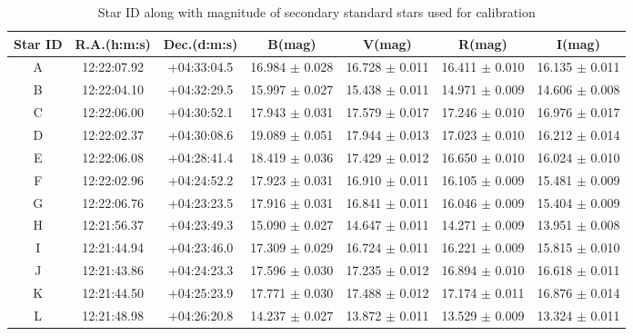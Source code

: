 \begin{table*}
\caption{Star ID along with magnitude of secondary standard stars used for calibration}
\centering
\smallskip
\begin{tabular}{c c c c c c c }
\hline \hline
Star ID  & R.A.(h:m:s) & Dec.(d:m:s)      &  B(mag)              &       V(mag)                  &      R(mag)                   &      I(mag)               \\
                                      
\hline
A        & 12:22:07.92  & +04:33:04.5     &  16.984 $\pm$ 0.028	 & 	16.728 $\pm$ 0.011 	 & 	16.411 $\pm$  	0.010	 & 	16.135  $\pm$   0.011 \\
B        & 12:22:04.10  & +04:32:29.5     &  15.997 $\pm$ 0.027	 & 	15.438 $\pm$ 0.011 	 & 	14.971 $\pm$  	0.009	 & 	14.606  $\pm$   0.008 \\
C        & 12:22:06.00  & +04:30:52.1     &  17.943 $\pm$ 0.031	 & 	17.579 $\pm$ 0.017 	 & 	17.246 $\pm$  	0.010	 & 	16.976  $\pm$   0.017 \\
D        & 12:22:02.37  & +04:30:08.6     &  19.089 $\pm$ 0.051	 & 	17.944 $\pm$ 0.013 	 & 	17.023 $\pm$  	0.010	 & 	16.212  $\pm$   0.014 \\
E        & 12:22:06.08  & +04:28:41.4     &  18.419 $\pm$ 0.036	 & 	17.429 $\pm$ 0.012 	 & 	16.650 $\pm$  	0.010	 & 	16.024  $\pm$   0.010 \\
F        & 12:22:02.96  & +04:24:52.2     &  17.923 $\pm$ 0.031	 & 	16.910 $\pm$ 0.011 	 & 	16.105 $\pm$  	0.009	 & 	15.481  $\pm$   0.009 \\
G        & 12:22:06.76  & +04:23:23.5     &  17.916 $\pm$ 0.031	 & 	16.841 $\pm$ 0.011 	 & 	16.046 $\pm$  	0.009	 & 	15.404  $\pm$   0.009 \\
H        & 12:21:56.37  & +04:23:49.3     &  15.090 $\pm$ 0.027	 & 	14.647 $\pm$ 0.011 	 & 	14.271 $\pm$  	0.009	 & 	13.951  $\pm$   0.008 \\
I        & 12:21:44.94  & +04:23:46.0     &  17.309 $\pm$ 0.029	 & 	16.724 $\pm$ 0.011 	 & 	16.221 $\pm$  	0.009	 & 	15.815  $\pm$   0.010 \\
J        & 12:21:43.86  & +04:24:23.3     &  17.596 $\pm$ 0.030	 & 	17.235 $\pm$ 0.012 	 & 	16.894 $\pm$  	0.010	 & 	16.618  $\pm$   0.011 \\
K        & 12:21:44.50  & +04:25:23.9     &  17.771 $\pm$ 0.030	 & 	17.488 $\pm$ 0.012 	 & 	17.174 $\pm$  	0.011	 & 	16.876  $\pm$   0.014 \\
L        & 12:21:48.98  & +04:26:20.8     &  14.237 $\pm$ 0.027	 & 	13.872 $\pm$ 0.011 	 & 	13.529 $\pm$  	0.009	 & 	13.324  $\pm$   0.011 \\

\end{tabular}
\end{table*}
